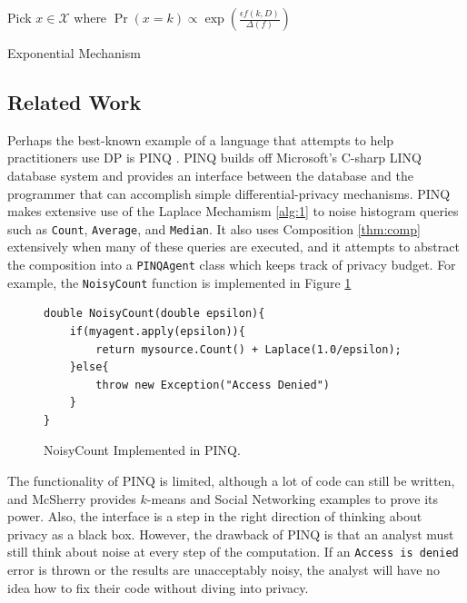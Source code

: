 \documentclass[11pt]{article}
\begin{document}
\begin{algorithm}\label{alg:exp}
\SetAlgoLined
{}
Pick $x \in \mathcal{X}$ where $\Pr(x=k) \propto \exp\left(\frac{\epsilon f(k, D)}{\Delta(f)}\right)$\;
\caption{Exponential Mechanism}
\end{algorithm}

\subsection{Related Work}

Perhaps the best-known example of a language that attempts to help practitioners use DP is PINQ \cite{McSherry:2010}. PINQ builds off Microsoft's C-sharp LINQ database system and provides an interface between the database and the programmer that can accomplish simple differential-privacy mechanisms. PINQ makes extensive use of the Laplace Mechamism \ref{alg:1} to noise histogram queries such as \texttt{Count}, \texttt{Average}, and \texttt{Median}. It also uses Composition \ref{thm:comp} extensively when many of these queries are executed, and it attempts to abstract the composition into a \texttt{PINQAgent} class which keeps track of privacy budget. For example, the \texttt{NoisyCount} function is implemented in Figure \ref{fig:PINQNoisyCount}
\begin{figure}
\begin{verbatim}
double NoisyCount(double epsilon){
    if(myagent.apply(epsilon)){
        return mysource.Count() + Laplace(1.0/epsilon);
    }else{
        throw new Exception("Access Denied")
    }
}
\end{verbatim}
\caption{NoisyCount Implemented in PINQ.}
\label{fig:PINQNoisyCount}
\end{figure}
The functionality of PINQ is limited, although a lot of code can still be written, and McSherry provides $k$-means and Social Networking examples to prove its power. Also, the interface is a step in the right direction of thinking about privacy as a black box. However, the drawback of PINQ is that an analyst must still think about noise at every step of the computation. If an \texttt{Access is denied} error is thrown or the results are unacceptably noisy, the analyst will have no idea how to fix their code without diving into privacy.
\end{document}
